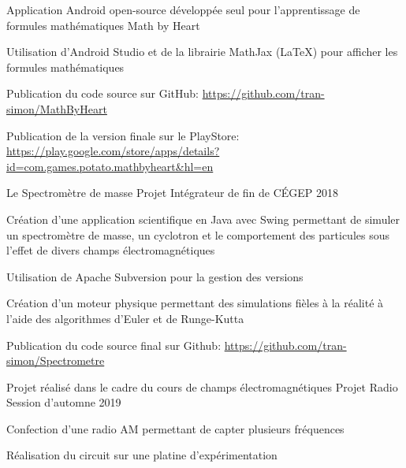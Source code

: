 \begin{cventries}
    \cventry
        {Application Android open-source développée seul pour l'apprentissage de formules mathématiques}
        {Math by Heart}
        {}
        {}
        {
       \begin{cvitems}
       \item{Utilisation d'Android Studio et de la librairie MathJax (LaTeX) pour afficher les formules mathématiques}
       \item{Publication du code source sur GitHub: \url{https://github.com/tran-simon/MathByHeart}}
       \item{Publication de la version finale sur le PlayStore: \url{https://play.google.com/store/apps/details?id=com.games.potato.mathbyheart&hl=en}}
       \end{cvitems}
        }
    \cventry
        {Le Spectromètre de masse}
        {Projet Intégrateur de fin de CÉGEP}
        {2018}
        {}
        {
            \begin{cvitems}
            \item{Création d'une application scientifique en Java avec Swing permettant de simuler un spectromètre de masse, un cyclotron et le comportement des particules sous l'effet de divers champs électromagnétiques}
            \item{Utilisation de Apache Subversion pour la gestion des versions}
            \item{Création d'un moteur physique permettant des simulations fièles à la réalité à l'aide des algorithmes d'Euler et de Runge-Kutta}
            \item{Publication du code source final sur Github: \url{https://github.com/tran-simon/Spectrometre}}
            \end{cvitems}
        }
    \cventry
	{Projet réalisé dans le cadre du cours de champs électromagnétiques}
	{Projet Radio}
	{Session d'automne 2019}
	{}
	{
	    \begin{cvitems}
	    \item{Confection d'une radio AM permettant de capter plusieurs fréquences}
	    \item{Réalisation du circuit sur une platine d'expérimentation}
	    \end{cvitems}
	}
\end{cventries}
